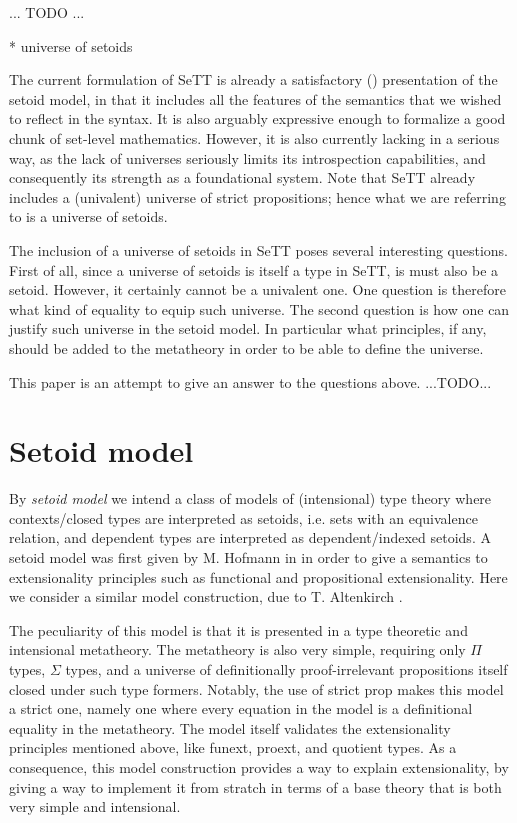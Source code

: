 \documentclass{easychair}
\begin{document}
... TODO ...

* universe of setoids

The current formulation of SeTT is already a satisfactory () presentation of
the setoid model, in that it includes all the features of the semantics that we
wished to reflect in the syntax. It is also arguably expressive enough to
formalize a good chunk of set-level mathematics. However, it is also currently
lacking in a serious way, as the lack of universes seriously limits its
introspection capabilities, and consequently its strength as a foundational
system. Note that SeTT already includes a (univalent) universe of strict
propositions; hence what we are referring to is a universe of setoids.

The inclusion of a universe of setoids in SeTT poses several interesting
questions. First of all, since a universe of setoids is itself a type in SeTT,
is must also be a setoid. However, it certainly cannot be a univalent one. One
question is therefore what kind of equality to equip such universe.
%
The second question is how one can justify such universe in the setoid model.
In particular what principles, if any, should be added to the metatheory in
order to be able to define the universe.

This paper is an attempt to give an answer to the questions above.
...TODO...

\section{Setoid model}


By \emph{setoid model} we intend a class of models of (intensional) type theory
where contexts/closed types are interpreted as setoids, i.e. sets with an
equivalence relation, and dependent types are interpreted as dependent/indexed
setoids.
%
A setoid model was first given by M. Hofmann in \cite{hofmann-ext-int} in order
to give a semantics to extensionality principles such as functional and
propositional extensionality. Here we consider a similar model construction, due
to T. Altenkirch \cite{setoid-model}.

The peculiarity of this model is that it is presented in a type theoretic and
intensional metatheory. The metatheory is also very simple, requiring only $\Pi$
types, $\Sigma$ types, and a universe of definitionally proof-irrelevant
propositions itself closed under such type formers.
%
Notably, the use of strict prop makes this model a strict one, namely one where
every equation in the model is a definitional equality in the metatheory.  The
model itself validates the extensionality principles mentioned above, like
funext, proext, and quotient types. As a consequence, this model construction
provides a way to explain extensionality, by giving a way to implement it from
stratch in terms of a base theory that is both very simple and intensional.
\end{document}
